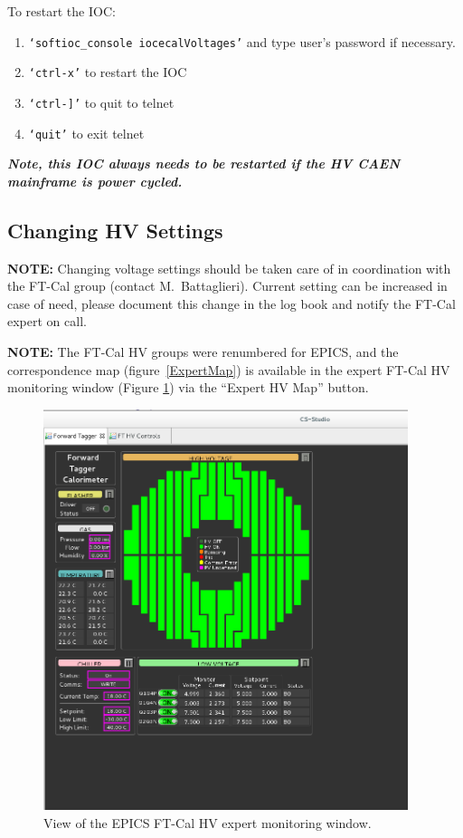 \documentclass[12pt]{article}
\begin{document}
   To restart the IOC:
   {\footnotesize
   \begin{enumerate}
       \item \texttt{`softioc\_console iocecalVoltages'} and type user's password if necessary.
       \item \texttt{`ctrl-x'} to restart the IOC
       \item \texttt{`ctrl-]'} to quit to telnet
       \item \texttt{`quit'} to exit telnet
   \end{enumerate}
   }

{\bf\em Note, this IOC always needs to be restarted if the HV CAEN mainframe is power cycled.}
   
   \subsection{Changing HV Settings}
      {\bf NOTE:} Changing voltage settings should be taken care of in coordination with the FT-Cal group (contact M.~Battaglieri). Current setting can be increased in case of need, please document this change in the log book and notify the FT-Cal expert on call.

 {\bf NOTE:} The FT-Cal HV groups were renumbered for EPICS, and the correspondence map (figure~\ref{ExpertMap}) is available in the expert FT-Cal HV monitoring window (Figure 
 \ref{HV}) via the ``Expert HV Map'' button.

\begin{figure}[htbp]
\center
\includegraphics[width=0.95\textwidth]{Images/All_Working_HVs.png}
\caption{ \label{HV} View of the EPICS FT-Cal HV expert monitoring window.}
\end{figure}
\end{document}
